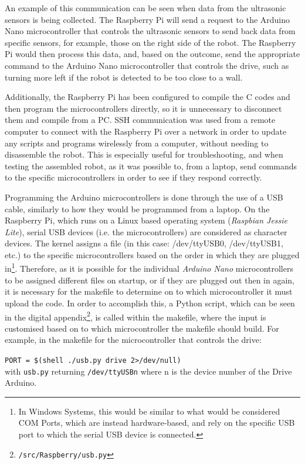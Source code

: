 \documentclass[11pt]{article}
\begin{document}
An example of this communication can be seen when data from the ultrasonic sensors is being collected. The Raspberry Pi will send a request to the Arduino Nano microcontroller that controls the ultrasonic sensors to send back data from specific sensors, for example, those on the right side of the robot. The Raspberry Pi would then process this data, and, based on the outcome, send the appropriate command to the Arduino Nano microcontroller that controls the drive, such as turning more left if the robot is detected to be too close to a wall.


Additionally, the Raspberry Pi has been configured to compile the C codes and then program the microcontrollers directly, so it is unnecessary to disconnect them and compile from a PC. SSH communication was used from a remote computer to connect with the Raspberry Pi over a network in order to update any scripts and programs wirelessly from a computer, without needing to disassemble the robot. This is especially useful for troubleshooting, and when testing the assembled robot, as it was possible to, from a laptop, send commands to the specific microcontrollers in order to see if they respond correctly.


Programming the Arduino microcontrollers is done through the use of a USB cable, similarly to how they would be programmed from a laptop. On the Raspberry Pi, which runs on a Linux based operating system (\textit{Raspbian Jessie Lite}), serial USB devices (i.e. the microcontrollers) are considered as character devices. The kernel assigns a file (in this case: /dev/ttyUSB0, /dev/ttyUSB1, etc.) to the specific microcontrollers based on the order in which they are plugged in\footnote{In Windows Systems, this would be similar to what would be considered COM Ports, which are instead hardware-based, and rely on the specific USB port to which the serial USB device is connected.}. Therefore, as it is possible for the individual \textit{Arduino Nano} microcontrollers to be assigned different files on startup, or if they are plugged out then in again, it is necessary for the makefile to determine on to which microcontroller it must upload the code. In order to accomplish this, a Python script, which can be seen in the digital appendix\footnote{\texttt{/src/Raspberry/usb.py}}, is called within the makefile, where the input is customised based on to which microcontroller the makefile should build. For example, in the makefile for the microcontroller that controls the drive:

\texttt{PORT = \$(shell ./usb.py drive 2>/dev/null)}\\
with \texttt{usb.py} returning \texttt{/dev/ttyUSBn} where n is the device number of the Drive Arduino.
\end{document}
